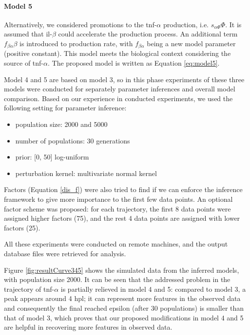 \paragraph{Model 5} Alternatively, we considered promotions to the tnf-$\alpha$ production, i.e. $s_{\alpha\Phi}\Phi$. It is assumed that il-$\beta$ could accelerate the production process. An additional term $f_{\beta\alpha}\beta$ is introduced to production rate, with $f_{\beta\alpha}$ being a new model parameter (positive constant). This model meets the biological context considering the source of tnf-$\alpha$. The proposed model is written as Equation \ref{eq:model5}.


Model 4 and 5 are based on model 3, so in this phase experiments of these three models were conducted for separately parameter inferences and overall model comparison. Based on our experience in conducted experiments, we used the following setting for parameter inference:

\begin{itemize}
    \item population size: 2000 and 5000
    \item number of populations: 30 generations
    \item prior: [0, 50] log-uniform
    \item perturbation kernel: multivariate normal kernel
\end{itemize}

Factors (Equation \ref{dis_f}) were also tried to find if we can enforce the inference framework to give more importance to the first few data points. An optional factor scheme was proposed: for each trajectory, the first 8 data points were assigned higher factors (75), and the rest 4 data points are assigned with lower factors (25).

All these experiments were conducted on remote machines, and the output database files were retrieved for analysis.

Figure \ref{fig:resultCurve345} shows the simulated data from the inferred models, with population size 2000. It can be seen that the addressed problem in the trajectory of tnf-$\alpha$ is partially relieved in model 4 and 5: compared to model 3, a peak appears around 4 hpl; it can represent more features in the observed data and consequently the final reached epsilon (after 30 populations) is smaller than that of model 3, which proves that our proposed modifications in model 4 and 5 are helpful in recovering more features in observed data.

